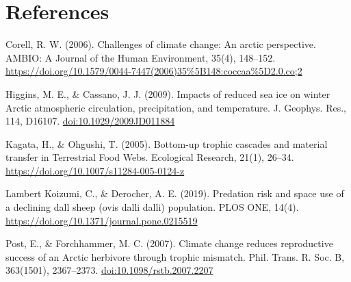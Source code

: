 \documentclass[
  12pt,
]{article}
\begin{document}
\newpage

\hypertarget{references}{%
\section{References}\label{references}}

Corell, R. W. (2006). Challenges of climate change: An arctic
perspective. AMBIO: A Journal of the Human Environment, 35(4), 148--152.
\url{https://doi.org/10.1579/0044-7447(2006)35\%5B148:coccaa\%5D2.0.co;2}

Higgins, M. E., \& Cassano, J. J. (2009). Impacts of reduced sea ice on
winter Arctic atmospheric circulation, precipitation, and temperature.
J. Geophys. Res., 114, D16107. \url{doi:10.1029/2009JD011884}

Kagata, H., \& Ohgushi, T. (2005). Bottom-up trophic cascades and
material transfer in Terrestrial Food Webs. Ecological Research, 21(1),
26--34. \url{https://doi.org/10.1007/s11284-005-0124-z}

Lambert Koizumi, C., \& Derocher, A. E. (2019). Predation risk and space
use of a declining dall sheep (ovis dalli dalli) population. PLOS ONE,
14(4). \url{https://doi.org/10.1371/journal.pone.0215519}

Post, E., \& Forchhammer, M. C. (2007). Climate change reduces
reproductive success of an Arctic herbivore through trophic mismatch.
Phil. Trans. R. Soc. B, 363(1501), 2367--2373.
\url{doi:10.1098/rstb.2007.2207}
\end{document}
